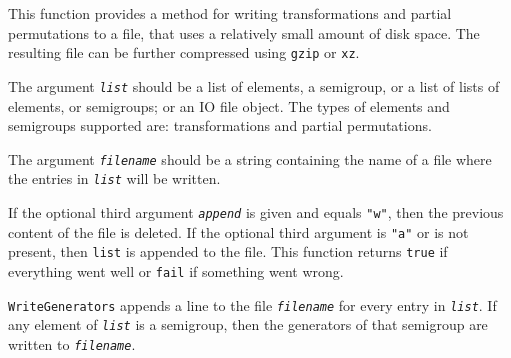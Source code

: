\documentclass[a4paper,11pt]{report}
\begin{document}
{{{ This function provides a method for writing transformations and partial
permutations to a file, that uses a relatively small amount of disk space. The
resulting file can be further compressed using \texttt{gzip} or \texttt{xz}.

 The argument \mbox{\texttt{\mdseries\slshape list}} should be a list of elements, a semigroup, or a list of lists of elements, or
semigroups; or an \textsf{IO} file object. The types of elements and semigroups supported are:
transformations and partial permutations.

 The argument \mbox{\texttt{\mdseries\slshape filename}} should be a string containing the name of a file where the entries in \mbox{\texttt{\mdseries\slshape list}} will be written. 

 If the optional third argument \mbox{\texttt{\mdseries\slshape append}} is given and equals \texttt{"w"}, then the previous content of the file is deleted. If the optional third
argument is \texttt{"a"} or is not present, then \texttt{list} is appended to the file. This function returns \texttt{true} if everything went well or \texttt{fail} if something went wrong.

 \texttt{WriteGenerators} appends a line to the file \mbox{\texttt{\mdseries\slshape filename}} for every entry in \mbox{\texttt{\mdseries\slshape list}}. If any element of \mbox{\texttt{\mdseries\slshape list}} is a semigroup, then the generators of that semigroup are written to \mbox{\texttt{\mdseries\slshape filename}}. 

}}}
\end{document}
